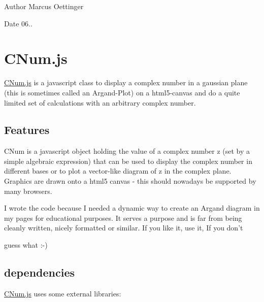 \begin{DoxyAuthor}{Author}
Marcus Oettinger 
\end{DoxyAuthor}
\begin{DoxyDate}{Date}
06.. 
\end{DoxyDate}
\hypertarget{index_CNum}{}\section{C\+Num.\+js}\label{index_CNum}
\hyperlink{_c_num_8js_source}{C\+Num.\+js} is a javascript class to display a complex number in a gaussian plane (this is sometimes called an Argand-\/\+Plot) on a html5-\/canvas and do a quite limited set of calculations with an arbitrary complex number. \hypertarget{index_features}{}\subsection{Features}\label{index_features}
C\+Num is a javascript object holding the value of a complex number z (set by a simple algebraic expression) that can be used to display the complex number in different bases or to plot a vector-\/like diagram of z in the complex plane. Graphics are drawn onto a html5 canvas -\/ this should nowadays be supported by many browsers.

I wrote the code because I needed a dynamic way to create an Argand diagram in my pages for educational purposes. It serves a purpose and is far from being cleanly written, nicely formatted or similar. If you like it, use it, If you don't
\begin{DoxyItemize}
\item guess what \+:-\/) 
\end{DoxyItemize}\hypertarget{index_deps}{}\subsection{dependencies}\label{index_deps}
\hyperlink{_c_num_8js_source}{C\+Num.\+js} uses some external libraries\+:


